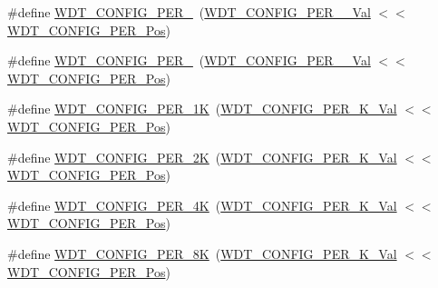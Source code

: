 \begin{DoxyCompactItemize}
\item 
\#define \mbox{\hyperlink{group___s_a_m_d21___w_d_t_ga71861c6c504e3310f67da37cdfb17425}{W\+D\+T\+\_\+\+C\+O\+N\+F\+I\+G\+\_\+\+P\+E\+R\+\_}}~(\mbox{\hyperlink{group___s_a_m_d21___w_d_t_ga12745e1d2f6572ab505a5691db652c33}{W\+D\+T\+\_\+\+C\+O\+N\+F\+I\+G\+\_\+\+P\+E\+R\+\_\+\_\+\+Val}}        $<$$<$ \mbox{\hyperlink{group___s_a_m_d21___w_d_t_ga55662a2fa7e16fd6cc7a5e0800034360}{W\+D\+T\+\_\+\+C\+O\+N\+F\+I\+G\+\_\+\+P\+E\+R\+\_\+\+Pos}})
\item 
\#define \mbox{\hyperlink{group___s_a_m_d21___w_d_t_gaef03f8f27885c24f55a8fd9be99e65c9}{W\+D\+T\+\_\+\+C\+O\+N\+F\+I\+G\+\_\+\+P\+E\+R\+\_}}~(\mbox{\hyperlink{group___s_a_m_d21___w_d_t_gab4e89108a94b765fbe516b4b29b61abe}{W\+D\+T\+\_\+\+C\+O\+N\+F\+I\+G\+\_\+\+P\+E\+R\+\_\+\_\+\+Val}}        $<$$<$ \mbox{\hyperlink{group___s_a_m_d21___w_d_t_ga55662a2fa7e16fd6cc7a5e0800034360}{W\+D\+T\+\_\+\+C\+O\+N\+F\+I\+G\+\_\+\+P\+E\+R\+\_\+\+Pos}})
\item 
\#define \mbox{\hyperlink{group___s_a_m_d21___w_d_t_gabacf2e3fc56acee60139ab1d166cf61c}{W\+D\+T\+\_\+\+C\+O\+N\+F\+I\+G\+\_\+\+P\+E\+R\+\_\+1K}}~(\mbox{\hyperlink{group___s_a_m_d21___w_d_t_ga6ddb8a8dbe2645d82c1647049855dc8c}{W\+D\+T\+\_\+\+C\+O\+N\+F\+I\+G\+\_\+\+P\+E\+R\+\_\+K\+\_\+\+Val}}         $<$$<$ \mbox{\hyperlink{group___s_a_m_d21___w_d_t_ga55662a2fa7e16fd6cc7a5e0800034360}{W\+D\+T\+\_\+\+C\+O\+N\+F\+I\+G\+\_\+\+P\+E\+R\+\_\+\+Pos}})
\item 
\#define \mbox{\hyperlink{group___s_a_m_d21___w_d_t_ga6cf0be01053f9184079cad59e1f79b5f}{W\+D\+T\+\_\+\+C\+O\+N\+F\+I\+G\+\_\+\+P\+E\+R\+\_\+2K}}~(\mbox{\hyperlink{group___s_a_m_d21___w_d_t_ga0badcc8b50d4a51234b750d60fe1347e}{W\+D\+T\+\_\+\+C\+O\+N\+F\+I\+G\+\_\+\+P\+E\+R\+\_\+K\+\_\+\+Val}}         $<$$<$ \mbox{\hyperlink{group___s_a_m_d21___w_d_t_ga55662a2fa7e16fd6cc7a5e0800034360}{W\+D\+T\+\_\+\+C\+O\+N\+F\+I\+G\+\_\+\+P\+E\+R\+\_\+\+Pos}})
\item 
\#define \mbox{\hyperlink{group___s_a_m_d21___w_d_t_ga53b7282727f8048f9f99000aec748509}{W\+D\+T\+\_\+\+C\+O\+N\+F\+I\+G\+\_\+\+P\+E\+R\+\_\+4K}}~(\mbox{\hyperlink{group___s_a_m_d21___w_d_t_gadf4430dc3c2be282d4fc2819030057bc}{W\+D\+T\+\_\+\+C\+O\+N\+F\+I\+G\+\_\+\+P\+E\+R\+\_\+K\+\_\+\+Val}}         $<$$<$ \mbox{\hyperlink{group___s_a_m_d21___w_d_t_ga55662a2fa7e16fd6cc7a5e0800034360}{W\+D\+T\+\_\+\+C\+O\+N\+F\+I\+G\+\_\+\+P\+E\+R\+\_\+\+Pos}})
\item 
\#define \mbox{\hyperlink{group___s_a_m_d21___w_d_t_ga191271b5cd71b2b7fdec34d1781b1f37}{W\+D\+T\+\_\+\+C\+O\+N\+F\+I\+G\+\_\+\+P\+E\+R\+\_\+8K}}~(\mbox{\hyperlink{group___s_a_m_d21___w_d_t_ga47d1ddf231377d6466cd3448916aea4b}{W\+D\+T\+\_\+\+C\+O\+N\+F\+I\+G\+\_\+\+P\+E\+R\+\_\+K\+\_\+\+Val}}         $<$$<$ \mbox{\hyperlink{group___s_a_m_d21___w_d_t_ga55662a2fa7e16fd6cc7a5e0800034360}{W\+D\+T\+\_\+\+C\+O\+N\+F\+I\+G\+\_\+\+P\+E\+R\+\_\+\+Pos}})

\end{DoxyCompactItemize}
